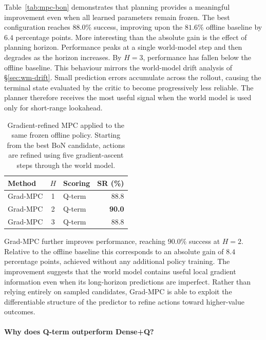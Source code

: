 Table~\ref{tab:mpc-bon} demonstrates that planning provides a
meaningful improvement even when all learned parameters remain frozen.
The best configuration reaches $88.0\%$ success, improving upon the
$81.6\%$ offline baseline by $6.4$ percentage points.
More interesting than the absolute gain is the effect of planning
horizon. Performance peaks at a single world-model step and then
degrades as the horizon increases. By $H=3$, performance has fallen
below the offline baseline.
This behaviour mirrors the world-model drift analysis of
\S\ref{sec:wm-drift}. Small prediction errors accumulate across the
rollout, causing the terminal state evaluated by the critic to become
progressively less reliable. The planner therefore receives the most
useful signal when the world model is used only for short-range
lookahead.

\begin{table}[h]
\centering
\caption{Gradient-refined MPC applied to the same frozen offline policy.
Starting from the best BoN candidate, actions are refined using five
gradient-ascent steps through the world model.}
\label{tab:mpc-grad}
\begin{tabular}{l c l r}
\toprule
Method & $H$ & Scoring & SR (\%) \\
\midrule
Grad-MPC      & 1 & Q-term    & 88.8 \\
Grad-MPC      & 2 & Q-term    & \textbf{90.0} \\
Grad-MPC      & 3 & Q-term & 88.8 \\
\bottomrule
\end{tabular}
\end{table}

Grad-MPC further improves performance, reaching $90.0\%$ success at
$H=2$. Relative to the offline baseline this corresponds to an
absolute gain of $8.4$ percentage points, achieved without any
additional policy training.
The improvement suggests that the world model contains useful local
gradient information even when its long-horizon predictions are
imperfect. Rather than relying entirely on sampled candidates,
Grad-MPC is able to exploit the differentiable structure of the
predictor to refine actions toward higher-value outcomes.

\paragraph{Why does Q-term outperform Dense+Q?}

